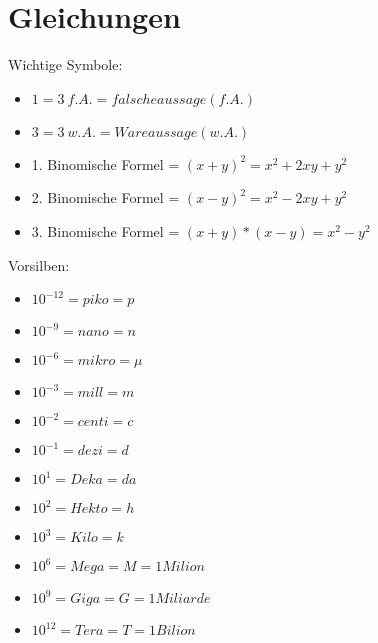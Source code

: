 \newpage
\section{Gleichungen}

\hfill \break
Wichtige Symbole:
\begin{itemize}
    \item $1=3\ f.A. = falsche aussage (f.A.)$
    \item $3=3\ w.A. = Ware aussage (w.A.)$
    \item 1. Binomische Formel = $(x+y)^2 = x^2+2xy+y^2$
    \item 2. Binomische Formel = $(x-y)^2 = x^2-2xy+y^2$
    \item 3. Binomische Formel = $(x+y)*(x-y) = x^2-y^2$
\end{itemize}

\hfill \break
Vorsilben:
\begin{itemize}
    \item $10^{-12} = piko = p $
    \item $10^{-9} = nano = n $
    \item $10^{-6} = mikro = \mu $
    \item $10^{-3} = mill = m$
    \item $10^{-2} = centi = c$
    \item $10^{-1} = dezi = d$
    \item $10^1 = Deka = da$
    \item $10^2 = Hekto = h$
    \item $10^3 = Kilo = k$
    \item $10^6 = Mega = M = 1 Milion$
    \item $10^9 = Giga = G = 1 Miliarde$
    \item $10^12 = Tera = T = 1 Bilion$
\end{itemize}


\break

\break

\break

\break

\break

\break

\break

\break

\break

\break

\break

\break

\break
